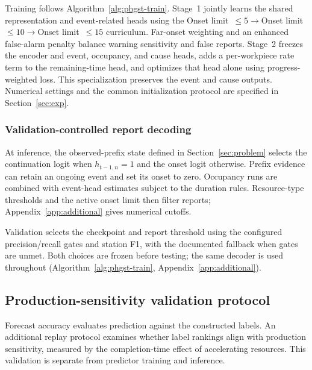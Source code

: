 \documentclass[a4paper,fleqn]{cas-dc}
\begin{document}
Training follows Algorithm~\ref{alg:phgst-train}. Stage~1 jointly learns the shared representation and event-related heads using the Onset limit~$\leq5\rightarrow$Onset limit~$\leq10\rightarrow$Onset limit~$\leq15$ curriculum. Far-onset weighting and an enhanced false-alarm penalty balance warning sensitivity and false reports. Stage~2 freezes the encoder and event, occupancy, and cause heads, adds a per-workpiece rate term to the remaining-time head, and optimizes that head alone using progress-weighted loss. This specialization preserves the event and cause outputs. Numerical settings and the common initialization protocol are specified in Section~\ref{sec:exp}.

\subsubsection{Validation-controlled report decoding}

At inference, the observed-prefix state defined in Section~\ref{sec:problem} selects the continuation logit when $h_{t-1,n}=1$ and the onset logit otherwise. Prefix evidence can retain an ongoing event and set its onset to zero. Occupancy runs are combined with event-head estimates subject to the duration rules. Resource-type thresholds and the active onset limit then filter reports; Appendix~\ref{app:additional} gives numerical cutoffs.

Validation selects the checkpoint and report threshold using the configured precision/recall gates and station F1, with the documented fallback when gates are unmet. Both choices are frozen before testing; the same decoder is used throughout (Algorithm~\ref{alg:phgst-train}, Appendix~\ref{app:additional}).



\subsection{Production-sensitivity validation protocol}\label{sec:sensitivity-protocol}

Forecast accuracy evaluates prediction against the constructed labels. An additional replay protocol examines whether label rankings align with production sensitivity, measured by the completion-time effect of accelerating resources. This validation is separate from predictor training and inference.
\end{document}
